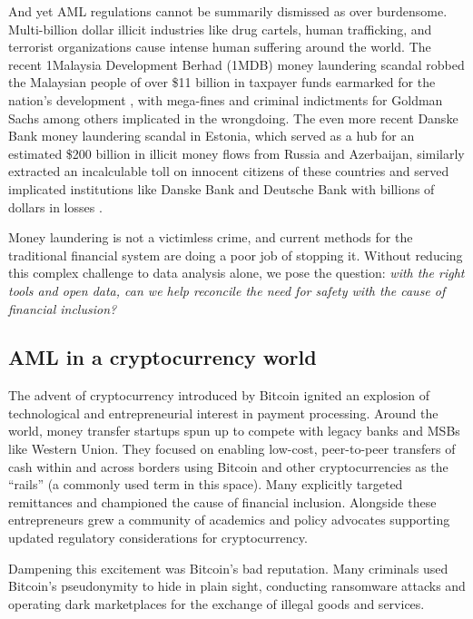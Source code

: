 \documentclass[sigconf,submission]{acmart}
\begin{document}
And yet AML regulations cannot be summarily dismissed as over burdensome. Multi-billion dollar illicit industries like drug cartels, human trafficking, and terrorist organizations cause intense human suffering around the world. The recent 1Malaysia Development Berhad (1MDB) money laundering scandal robbed the Malaysian people of over \$11 billion in taxpayer funds earmarked for the nation's development \citep{1MDB}, with mega-fines and criminal indictments for Goldman Sachs among others implicated in the wrongdoing. The even more recent Danske Bank money laundering scandal in Estonia, which served as a hub for an estimated \$200 billion in illicit money flows from Russia and Azerbaijan, similarly extracted an incalculable toll on innocent citizens of these countries and served implicated institutions like Danske Bank and Deutsche Bank with billions of dollars in losses \citep{Danske}.

Money laundering is not a victimless crime, and current methods for the traditional financial system are doing a poor job of stopping it. Without reducing this complex challenge to data analysis alone, we pose the question: \textit{with the right tools and open data, can we help reconcile the need for safety with the cause of financial inclusion?}

\subsection{AML in a cryptocurrency world}

The advent of cryptocurrency introduced by Bitcoin \cite{nakamoto} ignited an explosion of technological and entrepreneurial interest in payment processing. Around the world, money transfer startups spun up to compete with legacy banks and MSBs like Western Union. They focused on enabling low-cost, peer-to-peer transfers of cash within and across borders using Bitcoin and other cryptocurrencies as the ``rails'' (a commonly used term in this space). Many explicitly targeted remittances and championed the cause of financial inclusion. Alongside these entrepreneurs grew a community of academics and policy advocates supporting updated regulatory considerations for cryptocurrency.

Dampening this excitement was Bitcoin's bad reputation. Many criminals used Bitcoin's pseudonymity to hide in plain sight, conducting ransomware attacks and operating dark marketplaces for the exchange of illegal goods and services.
\end{document}
